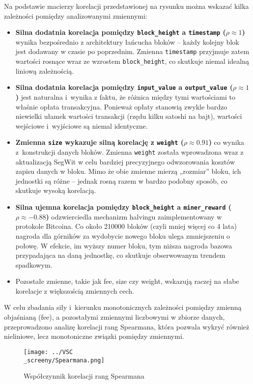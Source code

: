 \documentclass[12pt,a4paper]{report}
\theoremstyle{definition} %
\begin{document}
	Na podstawie macierzy korelacji przedstawionej na rysunku można wskazać kilka zależności pomiędzy analizowanymi zmiennymi:
	\begin{itemize}
	    \item \textbf{Silna dodatnia korelacja pomiędzy \texttt{block\_height} a \texttt{timestamp} ($\rho \approx 1$)} wynika bezpośrednio z architektury łańcucha bloków – każdy kolejny blok jest dodawany w czasie po poprzednim. Zmienna \texttt{timestamp} przyjmuje zatem wartości rosnące wraz ze wzrostem \texttt{block\_height}, co skutkuje niemal idealną liniową zależnością.
	   \item \textbf{Silna dodatnia korelacja pomiędzy \texttt{input\_value} a \texttt{output\_value} ($\rho \approx 1$)} jest naturalna i~wynika z faktu, że różnica między tymi wartościami to właśnie opłata transakcyjna. Ponieważ opłaty stanowią zwykle bardzo niewielki ułamek wartości transakcji (rzędu kilku satoshi na bajt), wartości wejściowe i~wyjściowe są niemal identyczne.
    	  \item \textbf{Zmienna \texttt{size} wykazuje silną korelację z \texttt{weight} ($\rho \approx 0.91$)} co wynika z~konstrukcji danych bloków. Zmienna \texttt{weight} została wprowadzona wraz z aktualizacją SegWit w celu bardziej precyzyjnego odwzorowania kosztów zapisu danych w bloku. Mimo że obie zmienne mierzą „rozmiar” bloku, ich jednostki są różne – jednak rosną razem w bardzo podobny sposób, co skutkuje wysoką korelacją.
   	   \item \textbf{Silna ujemna korelacja pomiędzy \texttt{block\_height} a \texttt{miner\_reward} ($\rho \approx -0.88$)} odzwierciedla mechanizm halvingu zaimplementowany w protokole Bitcoina. Co około 210000 bloków (czyli mniej więcej co 4 lata) nagroda dla górników za wydobycie nowego bloku ulega zmniejszeniu o połowę. W efekcie, im wyższy numer bloku, tym niższa nagroda bazowa przypadająca na daną jednostkę, co skutkuje obserwowanym trendem spadkowym.
	    \item Pozostałe zmienne, takie jak fee, size czy weight, wskazują raczej na słabe korelacje z większością zmiennych cech.
	\end{itemize}

	W celu zbadania siły i~kierunku monotonicznych zależności pomiędzy zmienną objaśnianą (fee), a pozostałymi zmiennymi liczbowymi w zbiorze danych, przeprowadzono analizę korelacji rang Spearmana, która pozwala wykryć również nieliniowe, lecz monotoniczne związki pomiędzy zmiennymi.

	\begin{figure}[H]
	    \centering
	    \texttt{[image: ../VSC\\\_screeny/Spearmana.png]} 
	    \caption{Współczynnik korelacji rang Spearmana}
	    \label{fig:Spearmana}
	\end{figure}
\end{document}
